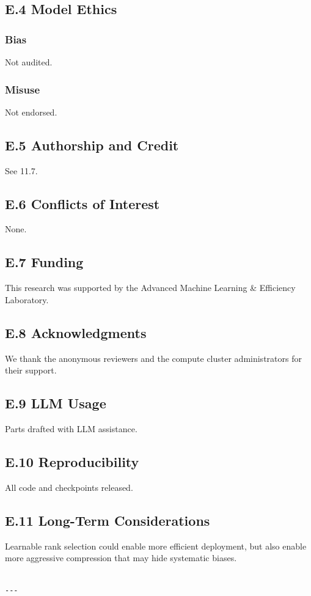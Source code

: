 \subsection{E.4 Model Ethics}

\subsubsection{Bias}
Not audited.

\subsubsection{Misuse}
Not endorsed.

\subsection{E.5 Authorship and Credit}
See  11.7.

\subsection{E.6 Conflicts of Interest}
None.

\subsection{E.7 Funding}
This research was supported by the Advanced Machine Learning \& Efficiency Laboratory.

\subsection{E.8 Acknowledgments}
We thank the anonymous reviewers and the compute cluster administrators for their support.

\subsection{E.9 LLM Usage}
Parts drafted with LLM assistance.

\subsection{E.10 Reproducibility}
All code and checkpoints released.

\subsection{E.11 Long-Term Considerations}
Learnable rank selection could enable more efficient deployment, but also 
enable more aggressive compression that may hide systematic biases.
\begin{lstlisting}

---
\end{lstlisting}
